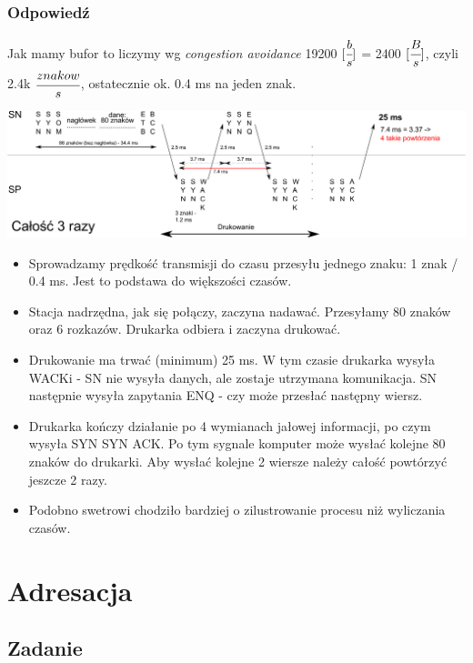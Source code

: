 		\subsubsection{Odpowiedź}
		Jak mamy bufor to liczymy wg \emph{congestion avoidance}
			19200 $ [\cfrac{b}{s}] $ = 2400 $ [\cfrac{B}{s}] $, czyli 2.4k $ \cfrac{znakow}{s} $, ostatecznie ok. 0.4 ms na jeden znak.
			\begin{center}
				\includegraphics[width=16.0cm]{./images/zadanie13.pdf}
			\end{center}
			\begin{itemize}
				\item Sprowadzamy prędkość transmisji do czasu przesyłu jednego znaku: 1 znak / 0.4 ms. Jest to podstawa do większości czasów.
				\item Stacja nadrzędna, jak się połączy, zaczyna nadawać. Przesyłamy 80 znaków oraz 6 rozkazów. Drukarka odbiera i zaczyna drukować.
				\item Drukowanie ma trwać (minimum) 25 ms. W tym czasie drukarka wysyła WACKi - SN nie wysyła danych, ale zostaje utrzymana komunikacja. SN następnie wysyła zapytania ENQ - czy może przesłać następny wiersz.
				\item Drukarka kończy działanie po 4 wymianach jałowej informacji, po czym wysyła SYN SYN ACK. Po tym sygnale komputer może wysłać kolejne 80 znaków do drukarki. Aby wysłać kolejne 2 wiersze należy całość powtórzyć jeszcze 2 razy.
				\item Podobno swetrowi chodziło bardziej o zilustrowanie procesu niż wyliczania czasów.
			\end{itemize}
			
			
\newpage
\section{Adresacja}
	\subsection{Zadanie}
